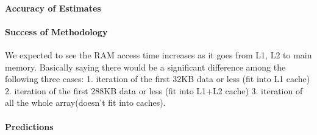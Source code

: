 \paragraph{Accuracy of Estimates}
\paragraph{Success of Methodology}
We expected to see the RAM access time increases as it goes from L1, L2 to main memory. Basically saying there would be a significant difference among the following three cases: 
1. iteration of the first 32KB data or less (fit into L1 cache)
2. iteration of the first 288KB data or less (fit into L1+L2 cache)
3. iteration of all the whole array(doesn’t fit into caches).
\paragraph{Predictions}

